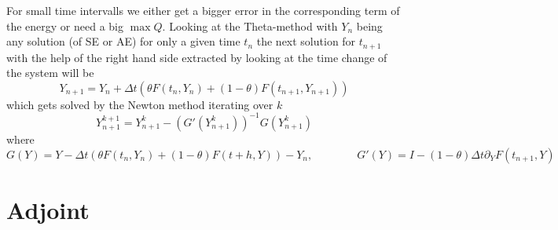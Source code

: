 \documentclass[landscape,parskip=half,7pt]{scrartcl}
\begin{document}
	For small time intervalls we either get a bigger error in the corresponding term of the energy or need a big $\max Q$. Looking at the Theta-method with $Y_n$ being any solution (of SE or AE) for only a given time $t_n$ the next solution for $t_{n+1}$ with the help of the right hand side extracted by looking at the time change of the system will be
	$$Y_{n+1}=Y_n+\Delta t\left(\theta F(t_n,Y_n)+(1-\theta)F(t_{n+1},Y_{n+1})\right)$$
	which gets solved by the Newton method iterating over $k$
	$$Y_{n+1}^{k+1}=Y_{n+1}^k-\left(G'(Y_{n+1}^k)\right)^{-1}G(Y_{n+1}^k)$$
	where
	$$G(Y)=Y-\Delta t\left(\theta F(t_n,Y_n)+(1-\theta)F(t+h,Y)\right)-Y_n,\qquad\qquad G'(Y)=I-(1-\theta)\Delta t\partial_Y F(t_{n+1},Y)$$


	\section{Adjoint}
\end{document}
